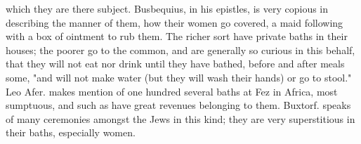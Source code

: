 {which they are there subject. Busbequius, in his epistles, is very copious in describing the manner of them, how their women go covered, a maid following with a box of ointment to rub them. The richer sort have private baths in their houses; the poorer go to the common, and are generally so curious in this behalf, that they will not eat nor drink until they have bathed, before and after meals some, "and will not make water (but they will wash their hands) or go to stool." Leo Afer.  makes mention of one hundred several baths at Fez in Africa, most sumptuous, and such as have great revenues belonging to them. Buxtorf.  speaks of many ceremonies amongst the Jews in this kind; they are very superstitious in their baths, especially women.

}
